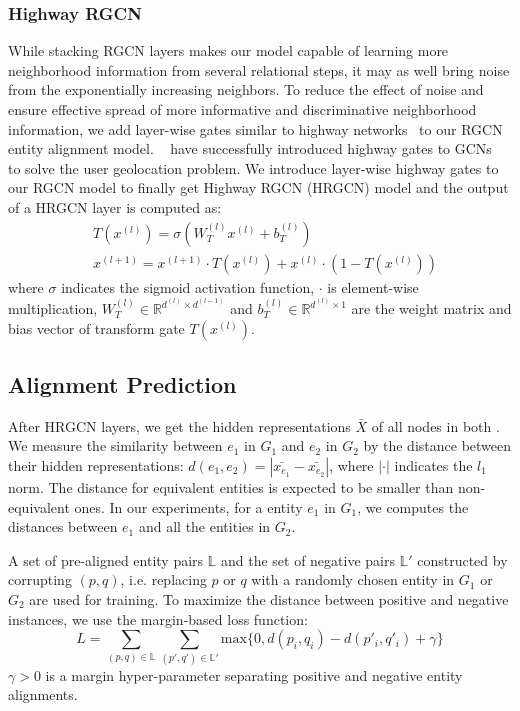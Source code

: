 	
	\subsubsection{Highway RGCN}
	\label{section:hgcn}
	While stacking RGCN layers makes our model capable of learning more neighborhood information from several relational steps, it may as well bring noise from the exponentially increasing neighbors. To reduce the effect of noise and ensure effective spread of more informative and discriminative neighborhood information, we add layer-wise gates similar to highway networks~\cite{Srivastava2015Highway} to our RGCN entity alignment model. ~\cite{Rahimi2018Semi} have successfully introduced highway gates to GCNs~\cite{Kipf2016Semi} to solve the user geolocation problem. We introduce layer-wise highway gates to our RGCN model to finally get Highway RGCN (HRGCN) model and the output of a HRGCN layer is computed as:
	\begin{equation}
	\begin{split}
	&T(x^{(l)})=\sigma(W_T^{(l)}x^{(l)}+b_T^{(l)}) \\
	&x^{(l+1)}=x^{(l+1)} \cdot T(x^{(l)})+x^{(l)} \cdot (1-T(x^{(l)}))
	\end{split}
	\end{equation}
	where $\sigma$ indicates the sigmoid activation function, $\cdot$ is element-wise multiplication, $W_T^{(l)} \in \mathbb{R}^{d^{(l)} \times d^{(l-1)}}$ and $b_T^{(l)} \in \mathbb{R}^{d^{(l)} \times 1}$ are the weight matrix and bias vector of transform gate $T(x^{(l)})$.
	
	\subsection{Alignment Prediction}
	After HRGCN layers, we get the hidden representations $\bar{X}$ of all nodes in both \KGs. We measure the similarity between $e_1$ in $G_1$ and $e_2$ in $G_2$ by the distance between their hidden representations: $d(e_1,e_2)=|\bar{x_{e_1}}-\bar{x_{e_2}}|$, where $|\cdot|$ indicates the $l_1$ norm. The distance for equivalent entities is expected to be smaller than non-equivalent ones. In our experiments, for a entity $e_1$ in $G_1$, we computes the distances between $e_1$ and all the entities in $G_2$.
	
	A set of pre-aligned entity pairs $\mathbb{L}$ and the set of negative pairs $\mathbb{L'}$  constructed by corrupting $(p, q)$, i.e. replacing $p$ or $q$ with a randomly chosen entity in $G_1$ or $G_2$ are used for training. To maximize the distance between positive and negative instances, we use the margin-based loss function:
	\begin{equation}
	L=\sum\limits_{(p,q)\in \mathbb{L}}\sum\limits_{(p',q')\in \mathbb{L'}}\mathrm{max}\{0,d(p_i,q_i)-d(p'_i,q'_i)+\gamma\}
	\end{equation}
	$\gamma > 0$ is a margin hyper-parameter separating positive and negative entity alignments.
	
